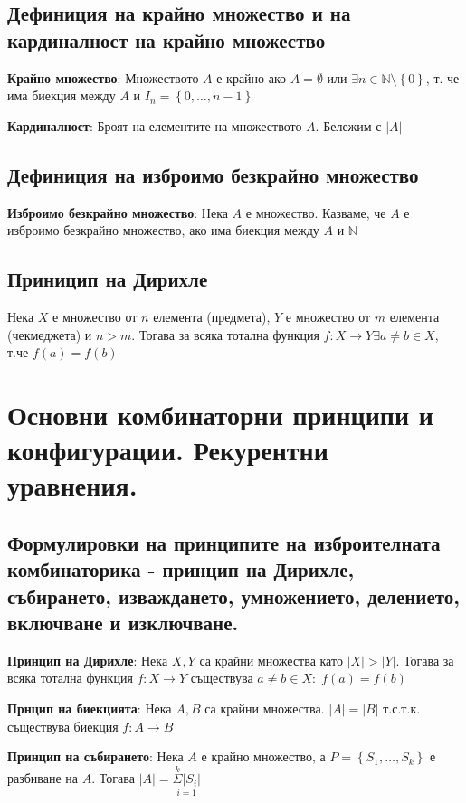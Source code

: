 \documentclass{article}
\renewcommand{\\}{\newline}
\begin{document}
    \subsection{Дефиниция на крайно множество и на кардиналност на крайно множество }
    \textbf{Крайно множество}: Множеството \(A\) е крайно ако \(A = \emptyset\) или \(\exists n \in \mathbb{N}\setminus \left\{0\right\}\), т. че  има биекция между \(A\) и \(I_{n} = \left\{0,\dots, n-1\right\}\)

    \textbf{Кардиналност}: Броят на елементите на множеството \(A\). Бележим с \(\left|A\right|\)    

    \subsection{Дефиниция на изброимо безкрайно множество }
   \textbf{Изброимо безкрайно множество}: Нека \(A\) е множество. Казваме, че \(A\) е изброимо безкрайно множество, ако има биекция между \(A\) и \(\mathbb{N}\)   

   \subsection{Приницип на Дирихле }    Нека \(X\) е множество от \(n\) елемента (предмета), \(Y\) е множество от \(m\) елемента (чекмеджета) и \(n > m\). Тогава за всяка тотална функция \(f: X \to Y \exists a \not= b \in X\), т.че \(f(a) = f(b)\)        

\newpage
\section{Основни комбинаторни принципи и конфигурации. Рекурентни уравнения.}
  \subsection{Формулировки на принципите на изброителната комбинаторика - принцип на Дирихле, събирането, изваждането, умножението, делението, включване и изключване. }

      \textbf{Принцип на Дирихле}: Нека \(X, Y\) са крайни множества като \(\left|X\right| > \left|Y\right|\). Тогава за всяка тотална функция \(f: X \to Y\) съществува \(a \not= b \in X:\; f(a) = f(b)\)     

      \textbf{Прнцип на биекцията}: Нека \(A, B\) са крайни множества. \(\left|A\right| = \left|B\right|\) т.с.т.к. съществува биекция \(f: A \to B\)    

      \textbf{Принцип на събирането}: Нека \(A\) е крайно множество, а \(P = \left\{S_1, \dots, S_k\right\}\) е разбиване на \(A\). Тогава \(\left|A\right|=\underset{i=1}{\overset{k}{\Sigma}\left|S_i\right|}\) 
\end{document}
